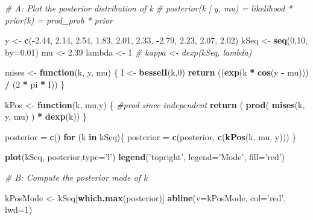 \documentclass[]{article}
\newenvironment{Shaded}{\begin{snugshade}}{\end{snugshade}}
\newcommand{\KeywordTok}[1]{\textcolor[rgb]{0.13,0.29,0.53}{\textbf{#1}}}
\newcommand{\DataTypeTok}[1]{\textcolor[rgb]{0.13,0.29,0.53}{#1}}
\newcommand{\DecValTok}[1]{\textcolor[rgb]{0.00,0.00,0.81}{#1}}
\newcommand{\FloatTok}[1]{\textcolor[rgb]{0.00,0.00,0.81}{#1}}
\newcommand{\StringTok}[1]{\textcolor[rgb]{0.31,0.60,0.02}{#1}}
\newcommand{\CommentTok}[1]{\textcolor[rgb]{0.56,0.35,0.01}{\textit{#1}}}
\newcommand{\ControlFlowTok}[1]{\textcolor[rgb]{0.13,0.29,0.53}{\textbf{#1}}}
\newcommand{\OperatorTok}[1]{\textcolor[rgb]{0.81,0.36,0.00}{\textbf{#1}}}
\newcommand{\NormalTok}[1]{#1}
\begin{document}
\begin{Shaded}
\begin{Highlighting}[]
\CommentTok{# A: Plot the posterior distribution of k}
\CommentTok{# posterior(k | y, mu) = likelihood * prior(k) = prod_prob * prior}

\NormalTok{y <-}\StringTok{ }\KeywordTok{c}\NormalTok{(}\OperatorTok{-}\FloatTok{2.44}\NormalTok{, }\FloatTok{2.14}\NormalTok{, }\FloatTok{2.54}\NormalTok{, }\FloatTok{1.83}\NormalTok{, }\FloatTok{2.01}\NormalTok{, }\FloatTok{2.33}\NormalTok{, }\OperatorTok{-}\FloatTok{2.79}\NormalTok{, }\FloatTok{2.23}\NormalTok{, }\FloatTok{2.07}\NormalTok{, }\FloatTok{2.02}\NormalTok{)}
\NormalTok{kSeq <-}\StringTok{ }\KeywordTok{seq}\NormalTok{(}\DecValTok{0}\NormalTok{,}\DecValTok{10}\NormalTok{, }\DataTypeTok{by=}\FloatTok{0.01}\NormalTok{)}
\NormalTok{mu <-}\StringTok{ }\FloatTok{2.39}
\NormalTok{lambda <-}\StringTok{ }\DecValTok{1}
\CommentTok{# kappa <- dexp(kSeq, lambda)}

\NormalTok{mises <-}\StringTok{ }\ControlFlowTok{function}\NormalTok{(k, y, mu) \{}
\NormalTok{  I <-}\StringTok{ }\KeywordTok{besselI}\NormalTok{(k,}\DecValTok{0}\NormalTok{)}
  \KeywordTok{return}\NormalTok{ ((}\KeywordTok{exp}\NormalTok{(k }\OperatorTok{*}\StringTok{ }\KeywordTok{cos}\NormalTok{(y }\OperatorTok{-}\StringTok{ }\NormalTok{mu))) }\OperatorTok{/}\StringTok{ }\NormalTok{(}\DecValTok{2} \OperatorTok{*}\StringTok{ }\NormalTok{pi }\OperatorTok{*}\StringTok{ }\NormalTok{I))}
\NormalTok{\}}

\NormalTok{kPos <-}\StringTok{ }\ControlFlowTok{function}\NormalTok{(k, mu,y) \{}
  \CommentTok{#prod since independent}
  \KeywordTok{return}\NormalTok{ ( }\KeywordTok{prod}\NormalTok{( }\KeywordTok{mises}\NormalTok{(k, y, mu) ) }\OperatorTok{*}\StringTok{ }\KeywordTok{dexp}\NormalTok{(k))}
\NormalTok{\}}

\NormalTok{posterior =}\StringTok{ }\KeywordTok{c}\NormalTok{()}
\ControlFlowTok{for}\NormalTok{ (k }\ControlFlowTok{in}\NormalTok{ kSeq)\{}
\NormalTok{  posterior =}\StringTok{ }\KeywordTok{c}\NormalTok{(posterior, }\KeywordTok{c}\NormalTok{(}\KeywordTok{kPos}\NormalTok{(k, mu, y)))}
\NormalTok{\}}

\KeywordTok{plot}\NormalTok{(kSeq, posterior,}\DataTypeTok{type=}\StringTok{'l'}\NormalTok{)}
\KeywordTok{legend}\NormalTok{(}\StringTok{'topright'}\NormalTok{, }\DataTypeTok{legend=}\StringTok{'Mode'}\NormalTok{, }\DataTypeTok{fill=}\StringTok{'red'}\NormalTok{)}


\CommentTok{# B: Compute the posterior mode of k}

\NormalTok{kPosMode <-}\StringTok{ }\NormalTok{kSeq[}\KeywordTok{which.max}\NormalTok{(posterior)]}
\KeywordTok{abline}\NormalTok{(}\DataTypeTok{v=}\NormalTok{kPosMode, }\DataTypeTok{col=}\StringTok{'red'}\NormalTok{, }\DataTypeTok{lwd=}\DecValTok{1}\NormalTok{)}
\end{Highlighting}
\end{Shaded}
\end{document}
